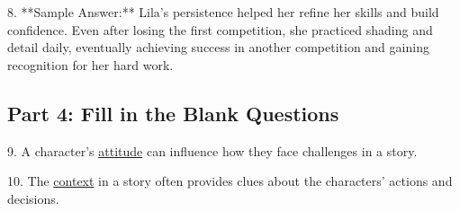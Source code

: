 \documentclass[12pt]{article}
\begin{document}
8. **Sample Answer:** Lila’s persistence helped her refine her skills and build confidence. Even after losing the first competition, she practiced shading and detail daily, eventually achieving success in another competition and gaining recognition for her hard work.

\subsection*{Part 4: Fill in the Blank Questions}

9. A character’s \underline{attitude} can influence how they face challenges in a story.

10. The \underline{context} in a story often provides clues about the characters’ actions and decisions.
\end{document}
